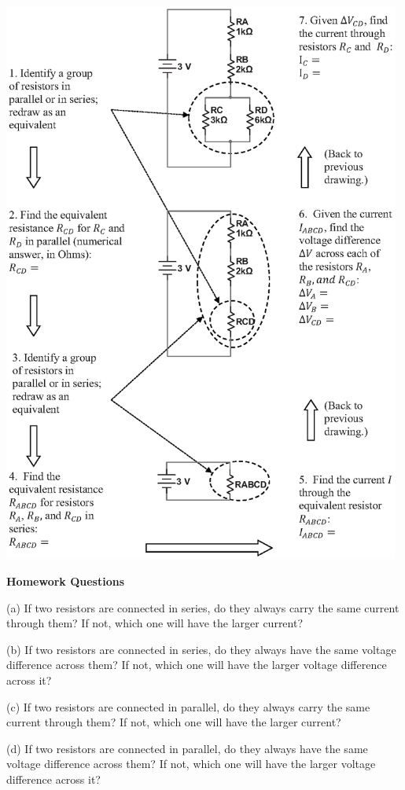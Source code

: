 \begin{center}
\includegraphics[width=0.98\textwidth]{electric_circuits2/step_by_step_circuit_bw.eps}
\vfill
\end{center}
\textbf{Homework Questions} \par
\nopagebreak
(a) If two resistors are connected in series, do they always carry the same current through them? If not, which one will have the larger current?
\vspace {0.7 in}

(b) If two resistors are connected in series, do they always have the same voltage difference across them?  If not, which one will have the larger voltage difference across it?
\vspace {0.7 in}

(c) If two resistors are connected in parallel, do they always carry the same current through them? If not, which one will have the larger current?
\vspace {0.7 in}

(d) If two resistors are connected in parallel, do they always have the same voltage difference across them?  If not, which one will have the larger voltage difference across it?
\vspace {0.7 in}

